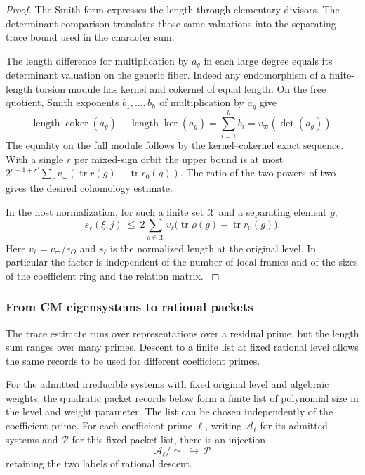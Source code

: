 \begin{proof}
The Smith form expresses the length through elementary divisors. The determinant comparison translates those same valuations into the separating trace bound used in the character sum.


The length difference for multiplication by \(a_g\) in
each large degree equals its determinant valuation on the
generic fiber. Indeed any endomorphism of a finite-length torsion module has kernel and cokernel of equal length. On the free quotient, Smith exponents \(b_1,\ldots,b_h\) of multiplication by \(a_g\) give
\[
 \operatorname{length}\operatorname{coker}(a_g)-
 \operatorname{length}\ker(a_g)=\sum_{i=1}^h b_i
 =v_\varpi(\det(a_g)).
\]
The equality on the full module follows by the kernel--cokernel exact sequence. With a single \(r\) per mixed-sign orbit the
upper bound is at most
\(2^{r+1+r'}\sum_r v_\varpi(\operatorname{tr}r(g)-
\operatorname{tr}r_0(g))\).
The ratio of the two powers of two gives the desired
cohomology estimate.

In the host normalization, for such a
finite set \(\mathcal X\) and a separating element \(g\),
\begin{equation}\label{eq:rankfour-length}
s_\ell(\xi,j)\ \le\
2\sum_{\rho\in\mathcal X}v_\ell\bigl(
           \operatorname{tr}\rho(g)-\operatorname{tr}r_0(g)\bigr).
\end{equation}
Here \(v_\ell=v_\varpi/e_O\) and \(s_\ell\) is the normalized
length at the original level. In particular the factor is
independent of the number of local frames and of the sizes
of the coefficient ring and the relation matrix.
\label{cor:ordinary-symplectic-cohomology-17}

\end{proof}

\subsubsection{From CM eigensystems to rational packets}

The trace estimate runs over representations over a residual prime, but the length sum ranges over many primes. Descent to a finite list at fixed rational level allows the same records to be used for different coefficient primes.

\begin{proposition}\label{prop:marked-rational-packets}
For the admitted irreducible systems with fixed original level
and algebraic weights, the quadratic packet records below form
a finite list of polynomial size in the level and weight
parameter. The list can be chosen independently of the coefficient
prime. For each coefficient prime \(\ell\), writing \(\mathcal A_\ell\) for its admitted systems and \(\mathcal P\) for this fixed packet list, there is an injection 
\[
 \mathcal A_\ell/{\simeq}\ \hookrightarrow\ \mathcal P
\]
 retaining the two labels of rational descent.
\end{proposition}

